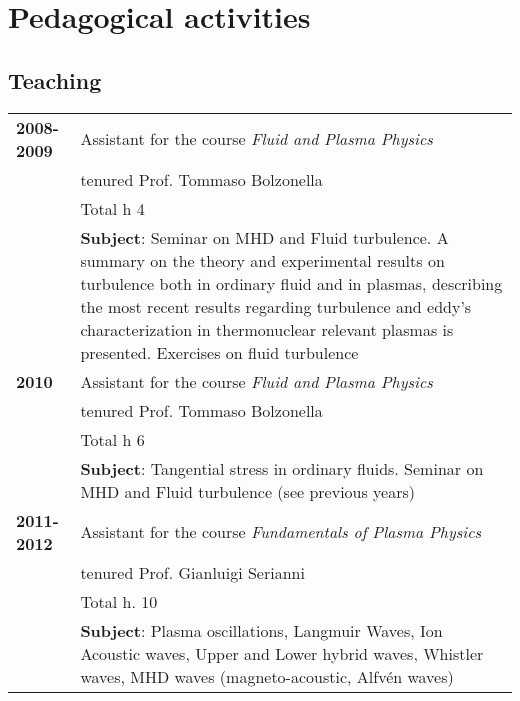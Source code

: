 \section{Pedagogical activities}
\subsection{Teaching}
\begin{longtable}{>{\bfseries}l p{15cm}}
2008-2009 & Assistant for the course \emph{Fluid and Plasma
  Physics} \\
& tenured
Prof. Tommaso Bolzonella  \\
 & Total h 4  \\ 
& \textbf{Subject}: Seminar on MHD and Fluid turbulence. 
A summary on the theory and experimental results on turbulence both in
ordinary fluid and in plasmas, describing the most
recent results regarding turbulence and eddy’s characterization in
thermonuclear relevant plasmas is presented. Exercises on fluid turbulence \\
2010 &  Assistant for the course \emph{Fluid and Plasma
  Physics} \\ 
& tenured
Prof. Tommaso Bolzonella  \\
 & Total h 6  \\
& \textbf{Subject}: Tangential stress in ordinary
fluids. Seminar on MHD and Fluid turbulence (see previous years)  \\
2011-2012 & Assistant for the course \emph{Fundamentals of Plasma
  Physics} \\ 
& tenured Prof. Gianluigi Serianni \\
& Total h. 10  \\
& \textbf{Subject}: Plasma oscillations, Langmuir Waves, Ion Acoustic
waves, Upper and Lower hybrid waves, Whistler waves, MHD waves
(magneto-acoustic, Alfv\'en waves)
\end{longtable}

